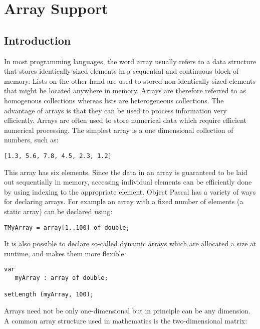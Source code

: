 {\bfseries\slshape\sffamily\color{ChapterTitleColor} \chapter{Array Support}} \label{chap:arrys}

\section{Introduction}

In most programming languages, the word array usually refers to a data structure that stores identically sized elements in a sequential and continuous block of memory. Lists on the other hand are used to stored non-identically sized elements that might be located anywhere in memory. Arrays are therefore referred to as homogenous collections whereas lists are heterogeneous collections. The advantage of arrays is that they can be used to process information very efficiently. Arrays are often used to store numerical data which require efficient numerical processing. The simplest array is a one dimensional collection of numbers, such as:

\begin{lstlisting}
[1.3, 5.6, 7.8, 4.5, 2.3, 1.2]
\end{lstlisting}

This array has six elements. Since the data in an array is guaranteed to be laid out sequentially in memory, accessing individual elements can be efficiently done by using indexing to the appropriate element. Object Pascal has a variety of ways for declaring arrays. For example an array with a fixed number of elements (a static array) can be declared using:

\begin{lstlisting}
TMyArray = array[1..100] of double;
\end{lstlisting}

It is also possible to declare so-called dynamic arrays which are allocated a size at runtime, and makes them more flexible:

\begin{lstlisting}
var
   myArray : array of double;

setLength (myArray, 100);
\end{lstlisting}

Arrays need not be only one-dimensional but in principle can be any dimension. A common array structure used in mathematics is the two-dimensional matrix:

